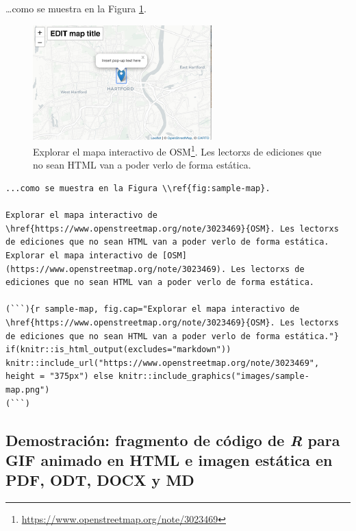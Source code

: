 \documentclass[
]{krantz}
\DeclareRobustCommand{\href}[2]{#2\footnote{\url{#1}}}
\begin{document}
\ldots como se muestra en la Figura \ref{fig:sample-map}.



\begin{figure}
\centering
\includegraphics{images/sample-map.pdf}
\caption{\label{fig:sample-map}Explorar el mapa interactivo de \href{https://www.openstreetmap.org/note/3023469}{OSM}. Les lectorxs de ediciones que no sean HTML van a poder verlo de forma estática.}
\end{figure}

\begin{verbatim}
...como se muestra en la Figura \\ref{fig:sample-map}.

Explorar el mapa interactivo de \href{https://www.openstreetmap.org/note/3023469}{OSM}. Les lectorxs de ediciones que no sean HTML van a poder verlo de forma estática. Explorar el mapa interactivo de [OSM](https://www.openstreetmap.org/note/3023469). Les lectorxs de ediciones que no sean HTML van a poder verlo de forma estática.

(```){r sample-map, fig.cap="Explorar el mapa interactivo de \href{https://www.openstreetmap.org/note/3023469}{OSM}. Les lectorxs de ediciones que no sean HTML van a poder verlo de forma estática."}
if(knitr::is_html_output(excludes="markdown")) knitr::include_url("https://www.openstreetmap.org/note/3023469", height = "375px") else knitr::include_graphics("images/sample-map.png")
(```)
\end{verbatim}

\hypertarget{demostraciuxf3n-fragmento-de-cuxf3digo-de-r-para-gif-animado-en-html-e-imagen-estuxe1tica-en-pdf-odt-docx-y-md}{%
\subsection{\texorpdfstring{Demostración: fragmento de código de \emph{R} para GIF animado en HTML e imagen estática en PDF, ODT, DOCX y MD}{Demostración: fragmento de código de R para GIF animado en HTML e imagen estática en PDF, ODT, DOCX y MD}}\label{demostraciuxf3n-fragmento-de-cuxf3digo-de-r-para-gif-animado-en-html-e-imagen-estuxe1tica-en-pdf-odt-docx-y-md}}
\end{document}
